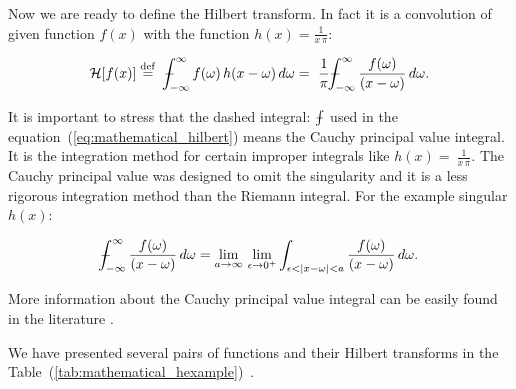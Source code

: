 \documentclass[12pt,twoside,a4paper]{article}
\numberwithin{equation}{subsection}
\numberwithin{figure}{subsection}
\def\Xint#1{\mathchoice
{\XXint\displaystyle\textstyle{#1}}%
{\XXint\textstyle\scriptstyle{#1}}%
{\XXint\scriptstyle\scriptscriptstyle{#1}}%
{\XXint\scriptscriptstyle\scriptscriptstyle{#1}}%
\!\int}
\def\XXint#1#2#3{{\setbox0=\hbox{$#1{#2#3}{\int}$ }\vcenter{\hbox{$#2#3$ }}\kern-.6\wd0}}
\def\dashint{\Xint-}
\begin{document}
Now we are ready to define the Hilbert transform. In fact it is a convolution of given function $f(x)$ with the function $h(x) =
\frac{1}{x \, \pi}$:

\begin{equation} \label{eq:mathematical_hilbert}
	\mathcal{H}[f(x)] \stackrel{\mathrm{def}}{=}
	 \ \dashint_{ - \infty }^{\infty } f(\omega) \, h(x - \omega) \, d\omega 
	=\ \frac{1}{\pi} \dashint_{ - \infty }^{\infty } \frac{f(\omega)}{(x - \omega)} \, d\omega . 
\end{equation}

It is important to stress that the dashed integral: $\dashint$ used in the equation~(\ref{eq:mathematical_hilbert}) means the Cauchy principal value integral. It is the integration method for certain improper integrals like $h(x) =\ \frac{1}{x \, \pi}$. The Cauchy principal value was designed to omit the singularity and it is a less rigorous integration method than the Riemann integral. For the example singular $ h(x) $:

\begin{equation} \label{eq:mathematical_cvp}
	\dashint_{ - \infty }^{\infty } \frac{f(\omega)}{(x - \omega)} \, d\omega = \lim_{a \to \infty} \, \lim_{\epsilon \to 0^{+}}\int_{ \epsilon < | x - \omega | < a }
	\frac{f(\omega)}{(x - \omega)} \, d\omega . 
\end{equation}

More information about the Cauchy principal value integral can be easily found in the literature \cite{henrici_applied}.

We have presented several pairs of functions and their Hilbert transforms in the Table~(\ref{tab:mathematical_hexample})~\cite{weisstein_hilbert}.
\end{document}
